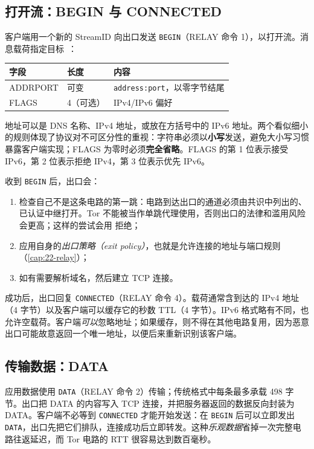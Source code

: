 \subsection{打开流：BEGIN 与 CONNECTED}

客户端用一个新的 StreamID 向出口发送 \texttt{BEGIN}（RELAY 命令 1），以打开流。消息载荷指定目标~：

\begin{center}
\begin{tabular}{lll}
\toprule
字段 & 长度 & 内容 \\
\midrule
ADDRPORT & 可变 & \texttt{address:port}，以零字节结尾 \\
FLAGS & 4（可选） & IPv4/IPv6 偏好 \\
\bottomrule
\end{tabular}
\end{center}

地址可以是 DNS 名称、IPv4 地址，或放在方括号中的 IPv6 地址。两个看似细小的规则体现了协议对不可区分性的重视：字符串必须以\textbf{小写}发送，避免大小写习惯暴露客户端实现；FLAGS 为零时必须\textbf{完全省略}。FLAGS 的第 1 位表示接受 IPv6，第 2 位表示拒绝 IPv4，第 3 位表示优先 IPv6。

收到 \texttt{BEGIN} 后，出口会：
\begin{enumerate}
  \item 检查自己不是这条电路的第一跳：电路到达出口的通道必须由共识中列出的、已认证中继打开。Tor 不能被当作单跳代理使用，否则出口的法律和滥用风险会更高；这样的尝试会用  拒绝；
  \item 应用自身的\emph{出口策略（exit policy）}，也就是允许连接的地址与端口规则（\cref{cap:22-relay}）；
  \item 如有需要解析域名，然后建立 TCP 连接。
\end{enumerate}

成功后，出口回复 \texttt{CONNECTED}（RELAY 命令 4）。载荷通常含到达的 IPv4 地址（4 字节）以及客户端可以缓存它的秒数 TTL（4 字节）。IPv6 格式略有不同，也允许空载荷。客户端\emph{可以}忽略地址；如果缓存，则不得在其他电路复用，因为恶意出口可能故意返回一个唯一地址，以便后来重新识别该客户端。

\subsection{传输数据：DATA}

应用数据使用 \texttt{DATA}（RELAY 命令 2）传输；传统格式中每条最多承载 498 字节。出口把 DATA 的内容写入 TCP 连接，并把服务器返回的数据反向封装为 DATA。客户端不必等到 \texttt{CONNECTED} 才能开始发送：在 \texttt{BEGIN} 后可以立即发出 \texttt{DATA}，出口先把它们排队，连接成功后立即转发。这种\emph{乐观数据}省掉一次完整电路往返延迟，而 Tor 电路的 RTT 很容易达到数百毫秒。

